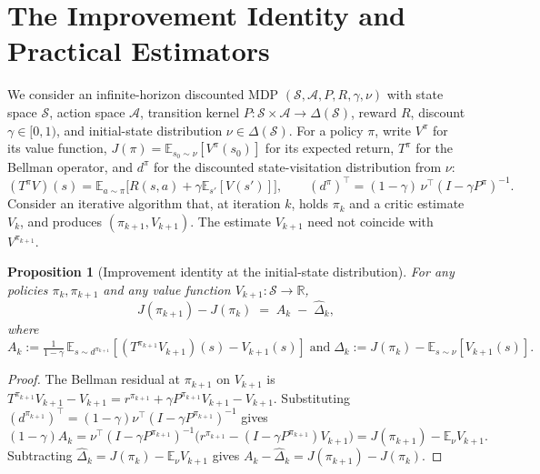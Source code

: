 \documentclass[11pt]{article}
\newtheorem{proposition}{Proposition}
\begin{document}
\section{The Improvement Identity and Practical Estimators}
\label{sec:setup}

We consider an infinite-horizon discounted MDP $(\mathcal{S}, \mathcal{A}, P, R, \gamma, \nu)$ with state space $\mathcal{S}$, action space $\mathcal{A}$, transition kernel $P : \mathcal{S} \times \mathcal{A} \to \Delta(\mathcal{S})$, reward $R$, discount $\gamma \in [0, 1)$, and initial-state distribution $\nu \in \Delta(\mathcal{S})$. For a policy $\pi$, write $V^\pi$ for its value function, $J(\pi) = \mathbb{E}_{s_0 \sim \nu}[V^\pi(s_0)]$ for its expected return, $T^\pi$ for the Bellman operator, and $d^\pi$ for the discounted state-visitation distribution from $\nu$:
\[
(T^\pi V)(s) = \mathbb{E}_{a \sim \pi}\!\big[R(s,a) + \gamma \mathbb{E}_{s'}[V(s')]\big], \qquad
(d^\pi)^\top = (1-\gamma) \,\nu^\top (I - \gamma P^\pi)^{-1}.
\]
Consider an iterative algorithm that, at iteration $k$, holds $\pi_k$ and a critic estimate $V_k$, and produces $(\pi_{k+1}, V_{k+1})$. The estimate $V_{k+1}$ need not coincide with $V^{\pi_{k+1}}$.

\begin{proposition}[Improvement identity at the initial-state distribution]
\label{prop:identity}
For any policies $\pi_k, \pi_{k+1}$ and any value function $V_{k+1} : \mathcal{S} \to \mathbb{R}$,
\begin{equation}
\label{eq:identity}
J(\pi_{k+1}) - J(\pi_k) \;=\; A_k \;-\; \hat\Delta_k,
\end{equation}
where
\begin{equation}
\label{eq:Ak-dhat}
A_k := \tfrac{1}{1-\gamma}\, \mathbb{E}_{s \sim d^{\pi_{k+1}}}\!\left[(T^{\pi_{k+1}} V_{k+1})(s) - V_{k+1}(s)\right]
\;\text{and}\;
\hat\Delta_k := J(\pi_k) - \mathbb{E}_{s \sim \nu}[V_{k+1}(s)].
\end{equation}
\end{proposition}

\begin{proof}
The Bellman residual at $\pi_{k+1}$ on $V_{k+1}$ is $T^{\pi_{k+1}} V_{k+1} - V_{k+1} = r^{\pi_{k+1}} + \gamma P^{\pi_{k+1}} V_{k+1} - V_{k+1}$. Substituting $(d^{\pi_{k+1}})^\top = (1-\gamma) \nu^\top (I - \gamma P^{\pi_{k+1}})^{-1}$ gives
\[
(1{-}\gamma) A_k
= \nu^\top (I - \gamma P^{\pi_{k+1}})^{-1} \big(r^{\pi_{k+1}} - (I - \gamma P^{\pi_{k+1}}) V_{k+1}\big)
= J(\pi_{k+1}) - \mathbb{E}_\nu V_{k+1}.
\]
Subtracting $\hat\Delta_k = J(\pi_k) - \mathbb{E}_\nu V_{k+1}$ gives $A_k - \hat\Delta_k = J(\pi_{k+1}) - J(\pi_k)$.
\end{proof}
\end{document}
